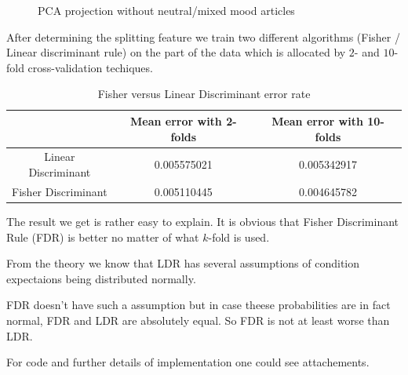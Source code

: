 \begin{figure}[h!]
\begin{minipage}[h]{0.45\linewidth}
	\caption{PCA projection without neutral/mixed mood articles}
	\label{fig:pca_without_mixed}
	\end{minipage}
\end{figure}

After determining the splitting feature  we train two different algorithms  (Fisher / Linear discriminant rule) on the part of the data which is allocated by $2$- and  $10$-fold cross-validation techiques. 


\begin{table}[h]
\centering
\label{tbl:fish_lin_disc}
\caption{Fisher versus Linear Discriminant error rate}
\begin{tabular}{|c|c|c|}
	\hline  & Mean error with 2-folds & Mean error with 10-folds \\ 
	\hline Linear Discriminant & 0.005575021  &  0.005342917 \\ 
	\hline Fisher Discriminant  & 0.005110445   & 0.004645782  \\ 
	\hline 
\end{tabular} 
\end{table} 

The result we get is rather easy to explain. It is obvious that Fisher Discriminant Rule (FDR) is better no matter of what $ k $-fold is used. 

From the theory we know that LDR has several assumptions of condition expectaions being distributed  normally. 

FDR doesn't have such a assumption but in case theese probabilities are in fact normal, FDR and LDR are absolutely equal. So FDR is not at least worse than LDR. 

For code and further details of implementation one could see attachements. 





